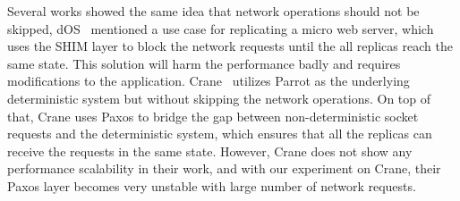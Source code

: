 Several works showed the same idea that network operations should not be skipped, dOS~\cite{bergan2010deterministic} mentioned a use case for replicating a micro web server, which uses the SHIM layer to block the network requests until the all replicas reach the same state. This solution will harm the performance badly and requires modifications to the application. Crane~\cite{cui2015p} utilizes Parrot\cite{cui2013parrot} as the underlying deterministic system but without skipping the network operations. On top of that, Crane uses Paxos to bridge the gap between non-deterministic socket requests and the deterministic system, which ensures that all the replicas can receive the requests in the same state. However, Crane does not show any performance scalability in their work, and with our experiment on Crane, their Paxos layer becomes very unstable with large number of network requests.